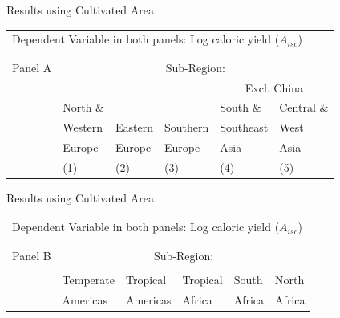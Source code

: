 \documentclass[10pt, xcolor=dvipsnames]{beamer}
\begin{document}
\begin{frame}{Results using Cultivated Area}

{\scriptsize
\begin{tabularx}{\textwidth}{lXXXXX}
\midrule
\multicolumn{6}{l}{Dependent Variable in both panels: Log caloric yield ($A_{isc}$)} \\ \\
\\
Panel A & \multicolumn{5}{c}{Sub-Region:} \\ \cmidrule{2-6}
 &          &         &             &  \multicolumn{2}{c}{Excl. China} \\ \cmidrule(lr){5-6}
 & North \& &         &              & South \&  & Central \&             \\
 & Western  & Eastern & Southern     & Southeast & West        \\
 & Europe   & Europe  & Europe       & Asia      & Asia      \\
 & (1) & (2) & (3) & (4) & (5) \\
\midrule

\midrule
\end{tabularx}
}

\end{frame}

\begin{frame}{Results using Cultivated Area}

{\scriptsize
\begin{tabularx}{\textwidth}{lXXXXX}
\midrule
\multicolumn{6}{l}{Dependent Variable in both panels: Log caloric yield ($A_{isc}$)} \\ \\
\\
Panel B & \multicolumn{5}{c}{Sub-Region:} \\ \cmidrule{2-6}
 &           &   &           &          &             \\
 & Temperate & Tropical  & Tropical & South    & North    \\
 & Americas  & Americas  & Africa   & Africa   & Africa     \\
\midrule

\midrule
\end{tabularx}
}

\end{frame}
\end{document}
